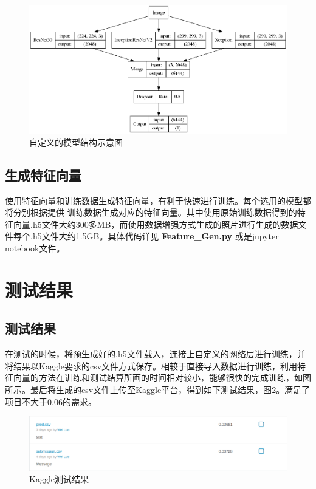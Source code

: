 \documentclass[a4paper,11pt]{article}
\begin{document}
\begin{figure}[htb]
\centering
\includegraphics[scale=0.38]{./figure/eg.png}
\caption{自定义的模型结构示意图}
\label{fig:selfmodel}
\end{figure}

\subsection{生成特征向量}
\label{sec:orgc6cef30}
使用特征向量和训练数据生成特征向量，有利于快速进行训练。每个选用的模型都将分别根据提供 训练数据生成对应的特征向量。其中使用原始训练数据得到的特征向量.h5文件大约300多MB，而使用数据增强方式生成的照片进行生成的数据文件每个.h5文件大约1.5GB。具体代码详见 \textbf{Feature\_Gen.py} 或是jupyter notebook文件。

\section{测试结果}
\label{sec:orge8415af}
\subsection{测试结果}
\label{sec:org634f99b}
在测试的时候，将预生成好的.h5文件载入，连接上自定义的网络层进行训练，并将结果以Kaggle要求的csv文件方式保存。相较于直接导入数据进行训练，利用特征向量的方法在训练和测试结算所画的时间相对较小，能够很快的完成训练，如图所示。最后将生成的csv文件上传至Kaggle平台，得到如下测试结果，图\ref{fig:kaggle}。满足了项目不大于0.06的需求。

\begin{figure}[htb]
\centering
\includegraphics[scale=0.25]{./figure/record.png}
\caption{Kaggle测试结果}
\label{fig:kaggle}
\end{figure}
\end{document}
